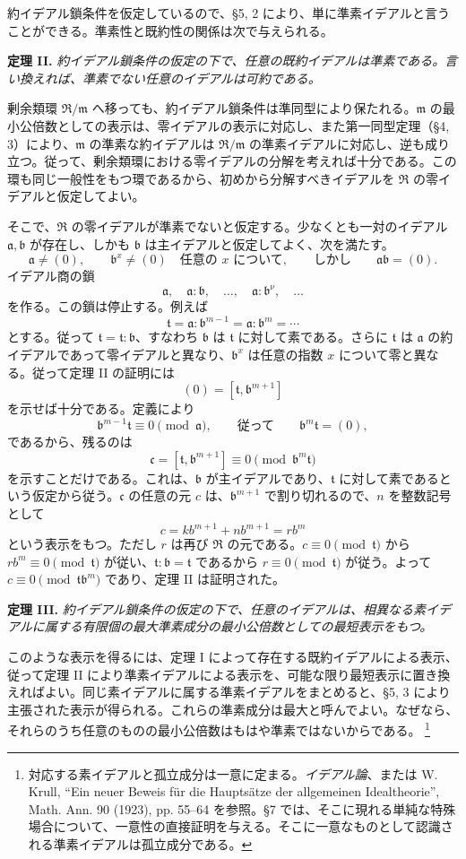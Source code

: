\documentclass[11pt]{article}
\providecommand{\mR}{\mathfrak{R}}
\providecommand{\ma}{\mathfrak{a}}
\providecommand{\mb}{\mathfrak{b}}
\providecommand{\mc}{\mathfrak{c}}
\providecommand{\mm}{\mathfrak{m}}
\providecommand{\mt}{\mathfrak{t}}
\begin{document}
約イデアル鎖条件を仮定しているので、§5, 2 により、単に準素イデアルと言うことができる。準素性と既約性の関係は次で与えられる。

\textbf{定理 II.} \emph{約イデアル鎖条件の仮定の下で、任意の既約イデアルは準素である。言い換えれば、準素でない任意のイデアルは可約である。}

剰余類環 $\mR/\mm$ へ移っても、約イデアル鎖条件は準同型により保たれる。$\mm$ の最小公倍数としての表示は、零イデアルの表示に対応し、また第一同型定理（§4, 3）により、$\mm$ の準素な約イデアルは $\mR/\mm$ の準素イデアルに対応し、逆も成り立つ。従って、剰余類環における零イデアルの分解を考えれば十分である。この環も同じ一般性をもつ環であるから、初めから分解すべきイデアルを $\mR$ の零イデアルと仮定してよい。

そこで、$\mR$ の零イデアルが準素でないと仮定する。少なくとも一対のイデアル $\ma,\mb$ が存在し、しかも $\mb$ は主イデアルと仮定してよく、次を満たす。
\[
\ma\ne(0),\qquad \mb^x\ne(0)\quad\text{任意の }x\text{ について},
\qquad\text{しかし}\qquad \ma\mb=(0).
\]
イデアル商の鎖
\[
\ma,\quad \ma:\mb,\quad \ldots,\quad \ma:\mb^\nu,\quad\ldots
\]
を作る。この鎖は停止する。例えば
\[
\mt=\ma:\mb^{m-1}=\ma:\mb^m=\cdots
\]
とする。従って $\mt=\mt:\mb$、すなわち $\mb$ は $\mt$ に対して素である。さらに $\mt$ は $\ma$ の約イデアルであって零イデアルと異なり、$\mb^x$ は任意の指数 $x$ について零と異なる。従って定理 II の証明には
\[
        (0)=[\mt,\mb^{m+1}]
\]
を示せば十分である。定義により
\[
        \mb^{m-1}\mt\equiv0\pmod{\ma},\qquad\text{従って}\qquad \mb^m\mt=(0),
\]
であるから、残るのは
\[
        \mc=[\mt,\mb^{m+1}]\equiv0\pmod{\mb^m\mt}
\]
を示すことだけである。これは、$\mb$ が主イデアルであり、$\mt$ に対して素であるという仮定から従う。$\mc$ の任意の元 $c$ は、$\mb^{m+1}$ で割り切れるので、$n$ を整数記号として
\[
        c=k b^{m+1}+n b^{m+1}=r b^m
\]
という表示をもつ。ただし $r$ は再び $\mR$ の元である。$c\equiv0\pmod{\mt}$ から $r b^m\equiv0\pmod{\mt}$ が従い、$\mt:\mb=\mt$ であるから $r\equiv0\pmod{\mt}$ が従う。よって $c\equiv0\pmod{\mt\mb^m}$ であり、定理 II は証明された。

\textbf{定理 III.} \emph{約イデアル鎖条件の仮定の下で、任意のイデアルは、相異なる素イデアルに属する有限個の最大準素成分の最小公倍数としての最短表示をもつ。}

このような表示を得るには、定理 I によって存在する既約イデアルによる表示、従って定理 II により準素イデアルによる表示を、可能な限り最短表示に置き換えればよい。同じ素イデアルに属する準素イデアルをまとめると、§5, 3 により主張された表示が得られる。これらの準素成分は最大と呼んでよい。なぜなら、それらのうち任意のものの最小公倍数はもはや準素ではないからである。
\footnote{対応する素イデアルと孤立成分は一意に定まる。\emph{イデアル論}、または W. Krull, ``Ein neuer Beweis für die Hauptsätze der allgemeinen Idealtheorie'', Math. Ann. 90 (1923), pp. 55--64 を参照。§7 では、そこに現れる単純な特殊場合について、一意性の直接証明を与える。そこに一意なものとして認識される準素イデアルは孤立成分である。}
\end{document}
